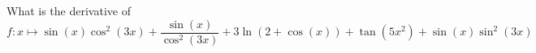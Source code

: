 
\bexo
 What is the derivative of 
 \begin{equation}
 	f:x\mapsto {\sin(x)}{\cos^2(3x)}+\dfrac{\sin(x)}{\cos^2(3x)}+3\ln(2+\cos(x))+\tan(5x^2)
 	+\sin(x)\sin^2(3x)
 \end{equation}
 \eexo

\solution{
}